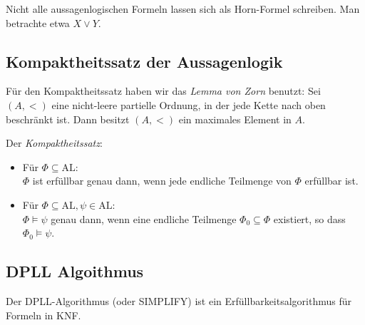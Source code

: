 \documentclass{panikzettel}
\newcommand{\AL}{\mathrm{AL}}
\begin{document}
Nicht alle aussagenlogischen Formeln lassen sich als Horn-Formel schreiben. Man betrachte etwa $X \lor Y$.

\subsection{Kompaktheitssatz der Aussagenlogik}

Für den Kompaktheitssatz haben wir das \emph{Lemma von Zorn} benutzt: Sei $(A, <)$ eine nicht-leere partielle Ordnung, in der jede Kette nach oben beschränkt ist. Dann besitzt $(A, <)$ ein maximales Element in $A$.

Der \emph{Kompaktheitssatz}:
\begin{itemize}
  \item Für $\Phi \subseteq \AL$:\\
  $\Phi$ ist erfüllbar genau dann, wenn jede endliche Teilmenge von $\Phi$ erfüllbar ist.
  \item
  Für $\Phi \subseteq \AL, \psi \in \AL$:\\
  $\Phi \models \psi$ genau dann, wenn eine endliche Teilmenge $\Phi_0 \subseteq \Phi$ existiert, so dass $\Phi_0 \models \psi$.
\end{itemize}

\subsection{DPLL Algoithmus}
Der DPLL-Algorithmus (oder SIMPLIFY) ist ein Erfüllbarkeitsalgorithmus für Formeln in KNF.
\end{document}

